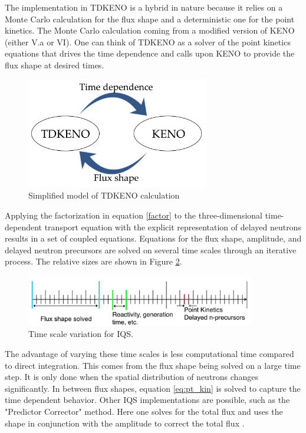 \documentclass[11pt]{article}
\begin{document}
 The implementation in TDKENO is a hybrid in nature because it relies on a Monte Carlo calculation for the flux shape and a deterministic one for the point kinetics.  The Monte Carlo calculation coming from a modified version of KENO (either V.a or VI).  One can think of TDKENO as a solver of the point kinetics equations that drives the time dependence and calls upon KENO to provide the flux shape at desired times. 
 \begin{figure}
     \centering
     \includegraphics[width=8cm]{figures/tdkeno_flow.pdf}
     \caption{Simplified model of TDKENO calculation}
     \label{fig:simpletdk}
 \end{figure}

Applying the factorization in equation \ref{factor} to the three-dimensional time-dependent transport equation with the explicit representation of delayed neutrons results in a set of coupled equations.  Equations for the flux shape, amplitude, and delayed neutron precursors are solved on several time scales through an iterative process. The relative sizes are shown in Figure \ref{fig:time_scale}. 

\begin{figure}[h]
    \centering
    \includegraphics[width=10cm]{figures/time_scale.pdf}
    \caption{Time scale variation for IQS.}
    \label{fig:time_scale}
\end{figure}

The advantage of varying these time scales is less computational time compared to direct integration.  This comes from the flux shape being solved on a large time step. It is only done when the spatial distribution of neutrons changes significantly.  In between flux shapes, equation \ref{eq:pt_kin} is solved to capture the time dependent behavior.  Other IQS implementations are possible, such as the "Predictor Corrector" method.  Here one solves for the total flux and uses the shape in conjunction with the amplitude to correct the total flux \cite{Dulla}.  
\end{document}
